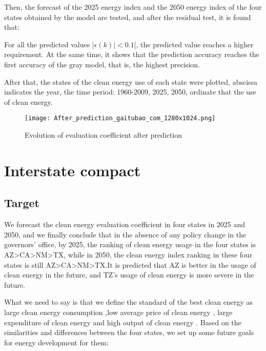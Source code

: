 \documentclass[a4paper]{article}
\begin{document}
Then, the forecast of the 2025 energy index and the 2050 energy index of the four states obtained by the model are tested, and after the residual test, it is found that:

For all the predicted values $|\epsilon (k)|< 0.1$|, the predicted value reaches a higher requirement.  At the same time, it shows that the prediction accuracy reaches the first accuracy of the gray model, that is, the highest precision.

After that, the states of the clean energy use of each state were plotted, abscissa indicates the year, the time period: 1960-2009, 2025, 2050, ordinate that the use of clean energy.

\begin{figure}[H]
	\begin{center}
		\texttt{[image: After\_prediction\_gaitubao\_com\_1280x1024.png]}
		\caption{Evolution of evaluation coefficient after prediction}
		\label{Fig:1}
	\end{center}
	\vspace{-0.5em}
\end{figure}



\section{Interstate compact}
\subsection{Target}

We forecast the clean energy evaluation coefficient in four states in 2025 and 2050, and we finally conclude that in the absence of any policy change in the governors' office, by 2025, the ranking of clean energy usage in the four states is AZ>CA>NM>TX, while in 2050, the clean energy index ranking in these four states is still AZ>CA>NM>TX.It is predicted that AZ is better in the usage of clean energy in the future, and TZ's usage of clean energy is more severe in the future.

What we need to say is that we define the standard of the best clean energy as large clean energy consumption ,low average price of clean energy , large expenditure of clean energy and high output of clean energy . Based on the similarities and differences between the four states, we set up some future goals for energy development for them\cite{energy}:
\end{document}
